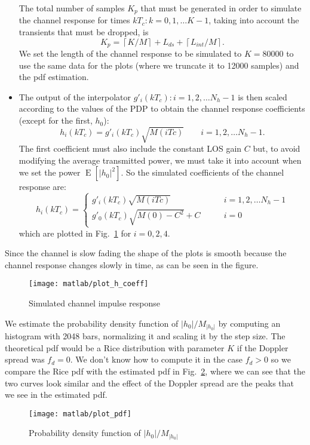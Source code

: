 \documentclass[a4paper,oneside]{article}
\newcommand{\E}[1]{\operatorname{E}\left[#1\right]}
\newcommand{\abs}[1]{\left|#1\right|}
\newcommand{\ceil}[1]{\left\lceil#1\right\rceil}
\begin{document}
\begin{itemize}
      The total number of samples $K_p$ that must be generated in
      order to simulate the channel response for times $kT_c :
      k=0,1,\dots K-1$, taking into account the transients that must
      be dropped, is
      \begin{equation}
        K_p = \ceil{K/M} + L_{ds} + \ceil{L_{int}/M} .
        \label{eq:Kp}
      \end{equation}
      We set the length of the channel response to be simulated to
      $K=80000$ to use the same data for the plots (where we truncate
      it to 12000 samples) and the pdf estimation.
      \item The output of the interpolator $g'_i(kT_c) : i=1,2,\dots
        N_h-1$ is then scaled according to the values of the PDP to
        obtain the channel response coefficients (except for the
        first, $h_0$):
        \begin{equation}
          h_i(kT_c) = g'_i(kT_c) \sqrt{M(iTc)} \qquad i=1,2,\dots N_h-1 .
        \end{equation}
        The first coefficient must also include the constant LOS gain
        $C$ but, to avoid modifying the average transmitted power, we
        must take it into account when we set the power
        $\E{\abs{h_0}^2}$. So the simulated coefficients of the
        channel response are:
        \begin{equation}
          h_i(kT_c) = \begin{cases}
            g'_i(kT_c) \sqrt{M(iTc)} \qquad & i=1,2,\dots N_h-1 \\
            g'_0(kT_c) \sqrt{M(0) - C^2} + C \qquad & i=0
            \end{cases}
        \end{equation}
        which are plotted in Fig.~\ref{plot:h_coeff} for $i=0,2,4$.
\end{itemize}
Since the channel is slow fading the shape of the plots is smooth
because the channel response changes slowly in time, as can be seen in
the figure.
\begin{figure}[p]
  \centering
  \texttt{[image: matlab/plot\_h\_coeff]}
  \caption{Simulated channel impulse response}
  \label{plot:h_coeff}
\end{figure}

We estimate the probability density function of
$\abs{h_0}/M_{\abs{h_0}}$ by computing an histogram with 2048 bars,
normalizing it and scaling it by the step size. The theoretical pdf
would be a Rice distribution with parameter $K$ if the Doppler spread was $f_d =
0$. We don't know how to compute it in the case $f_d > 0$ so we
compare the Rice pdf with the estimated pdf in Fig.~\ref{plot:pdf},
where we can see that the two curves look similar and the effect of
the Doppler spread are the peaks that we see in the estimated pdf.
\begin{figure}[htbp]
  \centering
  \texttt{[image: matlab/plot\_pdf]}
  \caption{Probability density function of $\abs{h_0}/M_{\abs{h_0}}$}
  \label{plot:pdf}
\end{figure}
\end{document}
